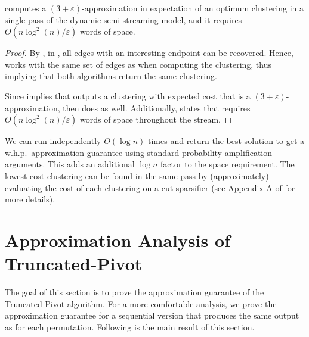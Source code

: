 \documentclass{theoretics}
\makeatletter
\newcommand{\seqtruncatedpivot}{Sequential \textrm{Truncated-Pivot}\xspace}
\newcommand{\truncatedpivot}{\textrm{Truncated-Pivot}\xspace}
\newcommand{\eps}{\ensuremath{\varepsilon}}
\newcommand\IfRestateTF{%
  \ifx\label\thmt@gobble@label %
    \expandafter\@firstoftwo
  \else
    \expandafter\@secondoftwo
  \fi
}
\newcommand{\RestateRemark}{\IfRestateTF{{\normalfont\bfseries (Restated) }}{}}
\makeatother
\begin{document}
{\begin{theorem}
     computes a $(3+\eps)$-approximation in expectation of an optimum clustering in a single pass of the dynamic semi-streaming model, and it requires $O(n\log^2(n)/\eps)$ words of space.
\end{theorem} 
\begin{proof}
    By , in , all edges with an interesting endpoint can be recovered. Hence,  works with the same set of edges as  when computing the clustering, thus implying that both algorithms return the same clustering. 
    
    Since  implies that  outputs a clustering with expected cost that is a $(3+\eps)$-approximation, then  does as well. 
    Additionally,  states that  requires $O(n\log^2(n)/\eps)$ words of space throughout the stream. 
\end{proof}

\begin{remark}
    We can run  independently $O(\log n)$ times and return the best solution to get a w.h.p.\ approximation guarantee using standard probability amplification arguments. This adds an additional $\log n$ factor to the space requirement. The lowest cost clustering can be found in the same pass by (approximately) evaluating the cost of each clustering on a cut-sparsifier \cite{ahn2009CutSparsifiers} (see Appendix A of \cite{behnezhad2023single} for more details).
\end{remark}

}

\section{Approximation Analysis of \truncatedpivot}\label{sec: approximation-analysis}

The goal of this section is to prove the approximation guarantee of the \truncatedpivot algorithm.
For a more comfortable analysis, we prove the approximation guarantee for a sequential version that produces the same output as  for each permutation. Following is the main result of this section.

\end{document}
